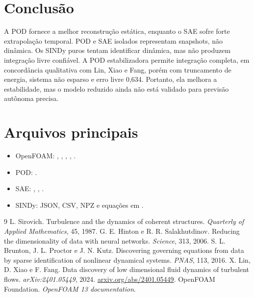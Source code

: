 \documentclass[12pt,a4paper]{article}
\begin{document}
\section{Conclusão}
A POD fornece a melhor reconstrução estática, enquanto o SAE sofre forte extrapolação temporal. POD e SAE isolados representam snapshots, não dinâmica. Os SINDy puros tentam identificar dinâmica, mas não produzem integração livre confiável. A POD estabilizadora permite integração completa, em concordância qualitativa com Lin, Xiao e Fang, porém com truncamento de energia, sistema não esparso e erro livre 0,634. Portanto, ela melhora a estabilidade, mas o modelo reduzido ainda não está validado para previsão autônoma precisa.

\appendix\section{Arquivos principais}
\small\begin{itemize}
\item OpenFOAM: , , , , .
\item POD: .
\item SAE: , , .
\item SINDy: JSON, CSV, NPZ e equações em .
\end{itemize}\normalsize
\begin{thebibliography}{9}
 L. Sirovich. Turbulence and the dynamics of coherent structures. \emph{Quarterly of Applied Mathematics}, 45, 1987.
 G. E. Hinton e R. R. Salakhutdinov. Reducing the dimensionality of data with neural networks. \emph{Science}, 313, 2006.
 S. L. Brunton, J. L. Proctor e J. N. Kutz. Discovering governing equations from data by sparse identification of nonlinear dynamical systems. \emph{PNAS}, 113, 2016.
 X. Lin, D. Xiao e F. Fang. Data discovery of low dimensional fluid dynamics of turbulent flows. \emph{arXiv:2401.05449}, 2024. \href{https://arxiv.org/abs/2401.05449}{arxiv.org/abs/2401.05449}.
 OpenFOAM Foundation. \emph{OpenFOAM 13 documentation}.
\end{thebibliography}
\end{document}
